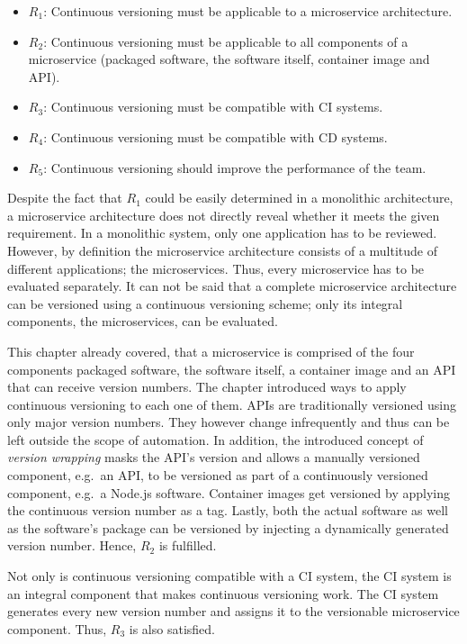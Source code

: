 \begin{itemize}
  \item $R_1$: Continuous versioning must be applicable to a microservice
    architecture.
  \item $R_2$: Continuous versioning must be applicable to all components of a
    microservice (packaged software, the software itself, container image and
    \ac{API}).
  \item $R_3$: Continuous versioning must be compatible with \ac{CI} systems.
  \item $R_4$: Continuous versioning must be compatible with \ac{CD} systems.
  \item $R_5$: Continuous versioning should improve the performance of the team.
\end{itemize}

Despite the fact that $R_1$ could be easily determined in a monolithic
architecture, a microservice architecture does not directly reveal whether it
meets the given requirement. In a monolithic system, only one application has
to be reviewed. However, by definition the microservice architecture consists
of a multitude of different applications; the microservices. Thus, every
microservice has to be evaluated separately. It can not be said that a complete
microservice architecture can be versioned using a continuous versioning
scheme; only its integral components, the microservices, can be evaluated.

This chapter already covered, that a microservice is comprised of the four
components packaged software, the software itself, a container image and an
\ac{API} that can receive version numbers. The chapter introduced ways to apply
continuous versioning to each one of them. \acp{API} are traditionally
versioned using only major version numbers. They however change infrequently
and thus can be left outside the scope of automation. In addition, the
introduced concept of \textit{version wrapping} masks the \ac{API}'s version
and allows a manually versioned component, e.g.\ an \ac{API}, to be versioned
as part of a continuously versioned component, e.g.\ a Node.js software.
Container images get versioned by applying the continuous version number as a
tag. Lastly, both the actual software as well as the software's package can be
versioned by injecting a dynamically generated version number. Hence, $R_2$ is
fulfilled.

Not only is continuous versioning compatible with a \ac{CI} system, the \ac{CI}
system is an integral component that makes continuous versioning work. The
\ac{CI} system generates every new version number and assigns it to the
versionable microservice component. Thus, $R_3$ is also satisfied.


